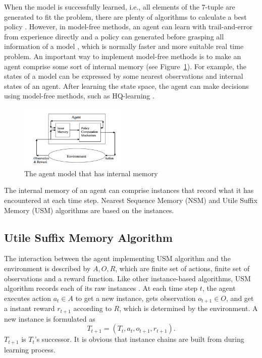 \documentclass[conference]{IEEEtran}
\begin{document}
	When the model is successfully learned, i.e., all elements of the 7-tuple are
	generated to fit the problem, there are plenty of algorithms to calculate a best
	policy \cite{shani2013survey}. However, in model-free methods, an agent can learn
	with trail-and-error from experience directly and a policy can generated before
	grasping all information of a model \cite{li2017deep}, which is normally faster
	and more suitable real time problem.  An important way to implement model-free
	methods is to make an agent comprise some sort of internal memory \cite{aberdeen2003policy,
		meuleau1999learning, mccallum1995instance} (see Figure~\ref{fig:agent memory}).
	For example, the states of a model can be expressed by some nearest observations
	and internal states of an agent. After learning the state space, the agent can make
	decisions using model-free methods, such as HQ-learning \cite{wiering1997hq}.
	
	\begin{figure}[h]
		\centering
		\includegraphics[width=0.45\textwidth]{agent_with_memory.png}
		\caption{The agent model that has internal memory}
		\label{fig:agent memory}
	\end{figure}
	
	The internal memory of an agent can comprise instances that record what it has
	encountered at each time step. Nearest Sequence Memory (NSM) and Utile
	Suffix Memory (USM) algorithms are based on the instances.
	
	
	\subsection{Utile Suffix Memory Algorithm}
	
	The interaction between the agent implementing USM algorithm and the environment is described by
	$A, O, R$, which are finite set of actions, finite set of observations and a reward function.
	Like other instance-based algorithms, USM algorithm records each of its raw instances
	\cite{mccallum1995instance}. At each time step $t$, the agent executes action
	$a_t \in A$ to get a new instance, gets observation $o_{t+1} \in O$, and get a
	instant reward $r_{t+1}$ according to $R$, which is determined by the environment.
	A new instance is formulated as
	\begin{equation}
	T_{t+1}= (T_t, a_t, o_{t+1}, r_{t+1}). \label{equ:instance}
	\end{equation}
	$T_{t+1}$ is $T_t$'s successor. It is obvious that instance chains are built
	from during learning process.
	
\end{document}
